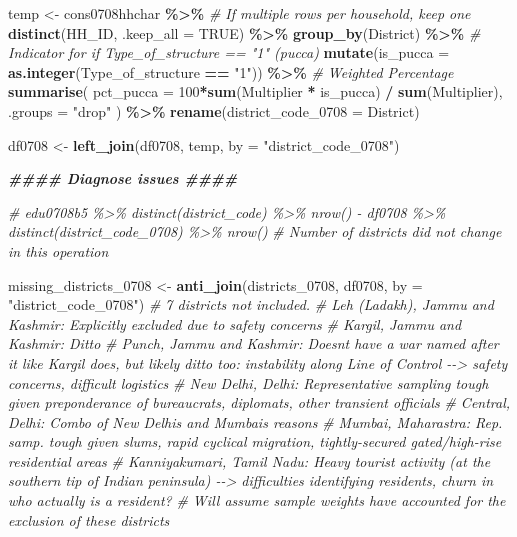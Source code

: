 \documentclass[
]{article}
\newenvironment{Shaded}{\begin{snugshade}}{\end{snugshade}}
\newcommand{\AttributeTok}[1]{\textcolor[rgb]{0.13,0.29,0.53}{#1}}
\newcommand{\CommentTok}[1]{\textcolor[rgb]{0.56,0.35,0.01}{\textit{#1}}}
\newcommand{\ConstantTok}[1]{\textcolor[rgb]{0.56,0.35,0.01}{#1}}
\newcommand{\DecValTok}[1]{\textcolor[rgb]{0.00,0.00,0.81}{#1}}
\newcommand{\DocumentationTok}[1]{\textcolor[rgb]{0.56,0.35,0.01}{\textbf{\textit{#1}}}}
\newcommand{\FunctionTok}[1]{\textcolor[rgb]{0.13,0.29,0.53}{\textbf{#1}}}
\newcommand{\NormalTok}[1]{#1}
\newcommand{\OtherTok}[1]{\textcolor[rgb]{0.56,0.35,0.01}{#1}}
\newcommand{\SpecialCharTok}[1]{\textcolor[rgb]{0.81,0.36,0.00}{\textbf{#1}}}
\newcommand{\StringTok}[1]{\textcolor[rgb]{0.31,0.60,0.02}{#1}}
\begin{document}
\begin{Shaded}
\begin{Highlighting}[]
\NormalTok{temp }\OtherTok{\textless{}{-}}\NormalTok{ cons0708hhchar }\SpecialCharTok{\%\textgreater{}\%}
  \CommentTok{\# If multiple rows per household, keep one}
  \FunctionTok{distinct}\NormalTok{(HH\_ID, }\AttributeTok{.keep\_all =} \ConstantTok{TRUE}\NormalTok{) }\SpecialCharTok{\%\textgreater{}\%} 
  \FunctionTok{group\_by}\NormalTok{(District) }\SpecialCharTok{\%\textgreater{}\%} 
  \CommentTok{\# Indicator for if Type\_of\_structure == "1" (pucca)}
  \FunctionTok{mutate}\NormalTok{(}\AttributeTok{is\_pucca =} \FunctionTok{as.integer}\NormalTok{(Type\_of\_structure }\SpecialCharTok{==} \StringTok{"1"}\NormalTok{)) }\SpecialCharTok{\%\textgreater{}\%}  
  \CommentTok{\# Weighted Percentage}
  \FunctionTok{summarise}\NormalTok{(}
    \AttributeTok{pct\_pucca =} \DecValTok{100}\SpecialCharTok{*}\FunctionTok{sum}\NormalTok{(Multiplier }\SpecialCharTok{*}\NormalTok{ is\_pucca) }\SpecialCharTok{/} \FunctionTok{sum}\NormalTok{(Multiplier),}
    \AttributeTok{.groups =} \StringTok{"drop"}
\NormalTok{  ) }\SpecialCharTok{\%\textgreater{}\%} 
    \FunctionTok{rename}\NormalTok{(}\AttributeTok{district\_code\_0708 =}\NormalTok{ District)}
  
\NormalTok{df0708 }\OtherTok{\textless{}{-}} \FunctionTok{left\_join}\NormalTok{(df0708, temp, }\AttributeTok{by =} \StringTok{"district\_code\_0708"}\NormalTok{)}



\DocumentationTok{\#\#\#\# Diagnose issues \#\#\#\#}

\CommentTok{\# edu0708b5 \%\textgreater{}\% distinct(district\_code) \%\textgreater{}\% nrow() {-} df0708 \%\textgreater{}\% distinct(district\_code\_0708) \%\textgreater{}\% nrow()}
\CommentTok{\# Number of districts did not change in this operation}

\NormalTok{missing\_districts\_0708 }\OtherTok{\textless{}{-}} \FunctionTok{anti\_join}\NormalTok{(districts\_0708, df0708, }\AttributeTok{by =} \StringTok{"district\_code\_0708"}\NormalTok{)}
\CommentTok{\# 7 districts not included. }
\CommentTok{\# Leh (Ladakh), Jammu and Kashmir: Explicitly excluded due to safety concerns}
\CommentTok{\# Kargil, Jammu and Kashmir: Ditto}
\CommentTok{\# Punch, Jammu and Kashmir: Doesn\textquotesingle{}t have a war named after it like Kargil does, but likely ditto too: instability along Line of Control {-}{-}\textgreater{} safety concerns, difficult logistics}
\CommentTok{\# New Delhi, Delhi: Representative sampling tough given preponderance of bureaucrats, diplomats, other transient officials}
\CommentTok{\# Central, Delhi: Combo of New Delhi\textquotesingle{}s and Mumbai\textquotesingle{}s reasons}
\CommentTok{\# Mumbai, Maharastra: Rep. samp. tough given slums, rapid cyclical migration, tightly{-}secured gated/high{-}rise residential areas }
\CommentTok{\# Kanniyakumari, Tamil Nadu: Heavy tourist activity (at the southern tip of Indian peninsula) {-}{-}\textgreater{} difficulties identifying residents, churn in who actually is a resident?}
\CommentTok{\# Will assume sample weights have accounted for the exclusion of these districts}


\end{Highlighting}
\end{Shaded}
\end{document}
